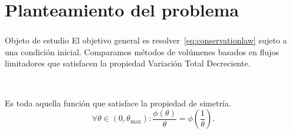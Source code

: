 \section{Planteamiento del problema}

\begin{frame}
	\frametitle{\secname}

	\begin{block}{Objeto de estudio}
		El objetivo general es resolver~\eqref{eq:conservationlaw}
		sujeto a una condición inicial.
		Comparamos métodos de volúmenes basados en flujos limitadores
		que satisfacen la propiedad \alert{Variación Total Decreciente}.
	\end{block}

	\

	\begin{definition}
		Es toda aquella función que satisface la propiedad de simetría.
		\begin{equation}
			\forall\theta\in
			\left(0,\theta_{\max}\right):
			\frac{\phi\left(\theta\right)}{\theta}=
			\phi
			\left(\frac{1}{\theta}\right).\tag{Simetría}
		\end{equation}
	\end{definition}
\end{frame}
